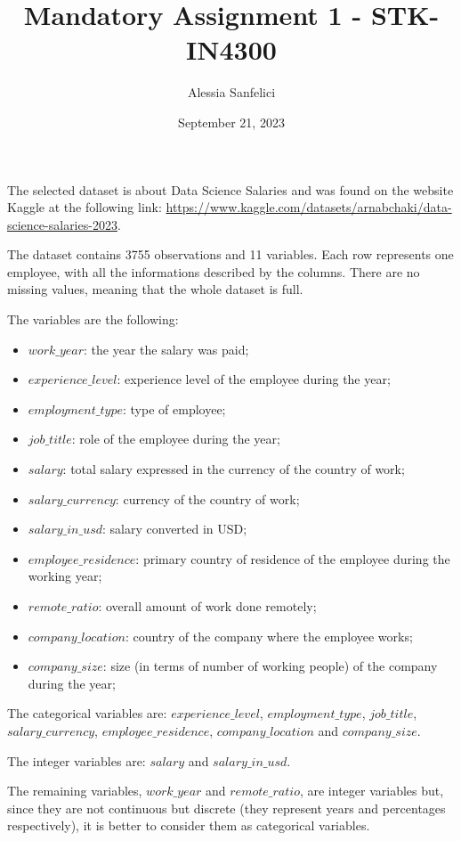 \documentclass[
]{article}
\title{Mandatory Assignment 1 - STK-IN4300}
\author{Alessia Sanfelici}
\date{September 21, 2023}
\begin{document}
\maketitle

The selected dataset is about Data Science Salaries and was found on the
website Kaggle at the following link:
\url{https://www.kaggle.com/datasets/arnabchaki/data-science-salaries-2023}.

The dataset contains 3755 observations and 11 variables. Each row
represents one employee, with all the informations described by the
columns. There are no missing values, meaning that the whole dataset is
full.

The variables are the following:

\begin{itemize}
\item
  \(work\_year\): the year the salary was paid;
\item
  \(experience\_level\): experience level of the employee during the
  year;
\item
  \(employment\_type\): type of employee;
\item
  \(job\_title\): role of the employee during the year;
\item
  \(salary\): total salary expressed in the currency of the country of
  work;
\item
  \(salary\_currency\): currency of the country of work;
\item
  \(salary\_in\_usd\): salary converted in USD;
\item
  \(employee\_residence\): primary country of residence of the employee
  during the working year;
\item
  \(remote\_ratio\): overall amount of work done remotely;
\item
  \(company\_location\): country of the company where the employee
  works;
\item
  \(company\_size\): size (in terms of number of working people) of the
  company during the year;
\end{itemize}

The categorical variables are: \(experience\_level\),
\(employment\_type\), \(job\_title\), \(salary\_currency\),
\(employee\_residence\), \(company\_location\) and \(company\_size\).

The integer variables are: \(salary\) and \(salary\_in\_usd\).

The remaining variables, \(work\_year\) and \(remote\_ratio\), are
integer variables but, since they are not continuous but discrete (they
represent years and percentages respectively), it is better to consider
them as categorical variables.
\end{document}

